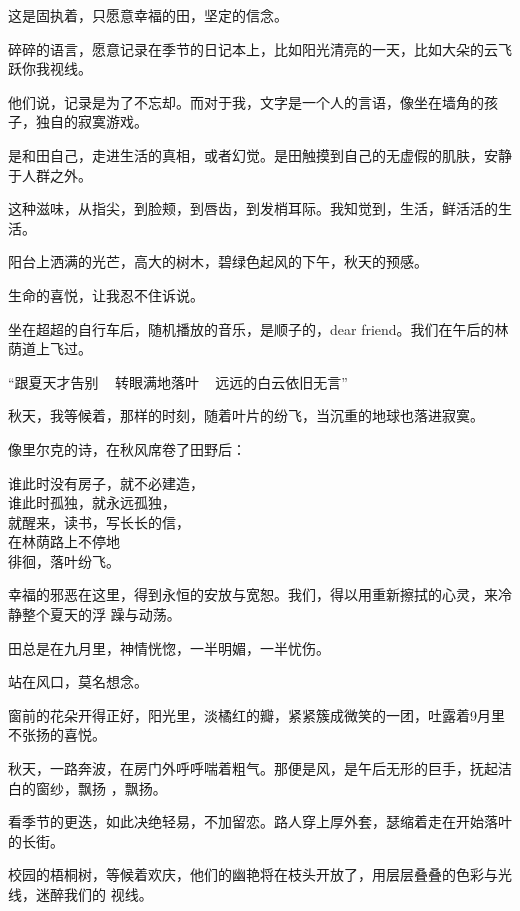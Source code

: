 \documentclass[12pt,a4paper]{article}
\begin{document}
		这是固执着，只愿意幸福的田，坚定的信念。

	\endwriting



		碎碎的语言，愿意记录在季节的日记本上，比如阳光清亮的一天，比如大朵的云飞跃你我视线。

		他们说，记录是为了不忘却。而对于我，文字是一个人的言语，像坐在墙角的孩子，独自的寂寞游戏。

		是和田自己，走进生活的真相，或者幻觉。是田触摸到自己的无虚假的肌肤，安静于人群之外。

		这种滋味，从指尖，到脸颊，到唇齿，到发梢耳际。我知觉到，生活，鲜活活的生活。

		阳台上洒满的光芒，高大的树木，碧绿色起风的下午，秋天的预感。

		生命的喜悦，让我忍不住诉说。

		坐在超超的自行车后，随机播放的音乐，是顺子的，dear friend。我们在午后的林荫道上飞过。

		“跟夏天才告别 ~ 转眼满地落叶 ~ 远远的白云依旧无言”

		秋天，我等候着，那样的时刻，随着叶片的纷飞，当沉重的地球也落进寂寞。

		像里尔克的诗，在秋风席卷了田野后：

		\longpoem{}{}{}
		谁此时没有房子，就不必建造，\\
		谁此时孤独，就永远孤独，\\
		就醒来，读书，写长长的信，\\
		在林荫路上不停地 \\
		徘徊，落叶纷飞。
		\endlongpoem

		幸福的邪恶在这里，得到永恒的安放与宽恕。我们，得以用重新擦拭的心灵，来冷静整个夏天的浮
	躁与动荡。

		田总是在九月里，神情恍惚，一半明媚，一半忧伤。

		站在风口，莫名想念。

	\endwriting



		窗前的花朵开得正好，阳光里，淡橘红的瓣，紧紧簇成微笑的一团，吐露着9月里不张扬的喜悦。

		秋天，一路奔波，在房门外呼呼喘着粗气。那便是风，是午后无形的巨手，抚起洁白的窗纱，飘扬
	，飘扬。

		看季节的更迭，如此决绝轻易，不加留恋。路人穿上厚外套，瑟缩着走在开始落叶的长街。

		校园的梧桐树，等候着欢庆，他们的幽艳将在枝头开放了，用层层叠叠的色彩与光线，迷醉我们的
	视线。
\end{document}
